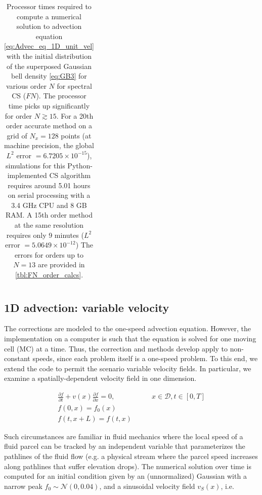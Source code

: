 \documentclass[11pt,titlepage]{report}
\begin{document}
\begin{table}
\begin{tabular}{@{}llcllclcl@{}}
\bottomrule[2 pt]
\end{tabular}
\caption{Processor times required to compute a numerical solution to advection equation \eqref{eq:Advec_eq_1D_unit_vel} with the initial distribution of the superposed Gaussian bell density \eqref{eq:GB3} for various order $N$ for spectral CS ($FN$). The processor time picks up significantly for order $N \gtrsim 15$. For a 20th order accurate method on a grid of $N_x = 128$ points (at machine precision, the global $L^2$ error $ = 6.7205\times 10^{-15}$), simulations for this Python-implemented CS algorithm requires around 5.01 hours on serial processing with a 3.4 GHz CPU and 8 GB RAM. A 15th order method at the same resolution requires only 9 minutes ($L^2$ error $ = 5.0649\times 10^{-12}$) The errors for orders up to $N = 13$ are provided in \ref{tbl:FN_order_calcs}.}
\label{tbl:FN_simtimes}
\end{table}


\subsection{1D advection: variable velocity}

\indent \indent The corrections are modeled to the one-speed advection equation. However, the implementation on a computer is such that the equation is solved for one moving cell (MC) at a time. Thus, the correction and methods develop apply to non-constant speeds, since each problem itself is a one-speed problem. To this end, we extend the code to permit the scenario variable velocity fields. In particular, we examine a spatially-dependent velocity field in one dimension. 

\begin{subequations}
\label{eq:Advec_eq_1D_unit_vel}
\begin{align}
\frac{\partial f}{\partial t} + v(x)\frac{\partial f}{\partial x} =  0, &\qquad x\in\mathcal{D}, t\in [0,T] \label{eq:1D_advec_equation_var_vel}\\[1em]
f(0,x) = f_0(x) \\[1em]
f(t,x + L) = f(t,x)
\end{align}
\end{subequations}


\noindent Such circumstances are familiar in fluid mechanics where the local speed of a fluid parcel can be tracked by an independent variable that parameterizes the pathlines of the fluid flow (e.g. a physical stream where the parcel speed increases along pathlines that suffer elevation drops). The numerical solution over time is computed for an initial condition given by an (unnormalized) Gaussian with a narrow peak $f_0 \sim \mathcal{N}(0,0.04)$, and a sinusoidal velocity field $v_S(x)$, i.e.
\end{document}
